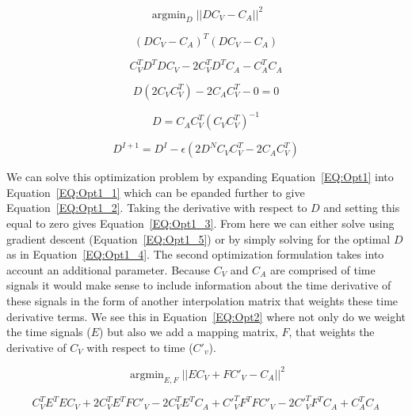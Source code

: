 \documentclass[12pt]{article}
\DeclareMathOperator*{\argmin}{argmin}
\begin{document}
\begin{equation}
\argmin_{D} ||DC_V - C_A||^2
\label{EQ:Opt1}
\end{equation}

\begin{equation}
(DC_V - C_A)^T(DC_V - C_A)
\label{EQ:Opt1_1}
\end{equation}

\begin{equation}
C_V^TD^TDC_V  - 2C_V^TD^TC_A - C_A^TC_A
\label{EQ:Opt1_2}
\end{equation}

\begin{equation}
D(2C_VC_V^T) - 2C_AC_V^T - 0 = 0
\label{EQ:Opt1_3}
\end{equation}

\begin{equation}
D = C_AC_V^T(C_VC_V^T)^{-1}
\label{EQ:Opt1_4}
\end{equation}

\begin{equation}
D^{I+1} = D^I - \epsilon(2D^NC_VC_V^T - 2C_AC_V^T)
\label{EQ:Opt1_5}
\end{equation}

We can solve this optimization problem by expanding Equation~\ref{EQ:Opt1} into Equation~\ref{EQ:Opt1_1} which can be epanded further to give Equation~\ref{EQ:Opt1_2}. Taking the derivative with respect to $D$ and setting this equal to zero gives Equation~\ref{EQ:Opt1_3}. From here we can either solve using gradient descent (Equation~\ref{EQ:Opt1_5}) or by simply solving for the optimal $D$ as in Equation~\ref{EQ:Opt1_4}. The second optimization formulation takes into account an additional parameter. Because $C_V$ and $C_A$ are comprised of time signals it would make sense to include information about the time derivative of these signals in the form of another interpolation matrix that weights these time derivative terms. We see this in Equation~\ref{EQ:Opt2} where not only do we weight the time signals ($E$) but also we add a mapping matrix, $F$, that weights the derivative of $C_V$ with respect to time ($C'_v$).

\begin{equation}
\argmin_{E,F} ||EC_V + FC'_V - C_A||^2
\label{EQ:Opt2}
\end{equation}

\begin{equation}
C_V^TE^TEC_V + 2C_V^TE^TFC'_V - 2C_V^TE^TC_A + C'_V^TF^TFC'_V - 2C'_V^TF^TC_A + C_A^TC_A
\label{EQ:Opt2_1}
\end{equation}
\end{document}
